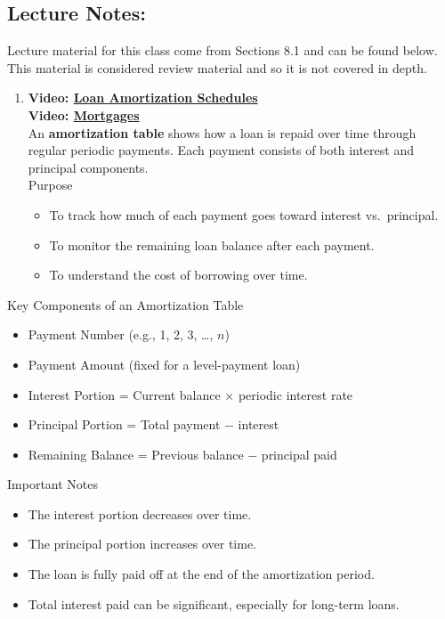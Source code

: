 \documentclass[
]{book}
\providecommand{\tightlist}{%
  \setlength{\itemsep}{0pt}\setlength{\parskip}{0pt}}
\begin{document}
\subsection*{Lecture Notes:}\label{lecture-notes-17}

Lecture material for this class come from Sections 8.1 and can be found below. This material is considered review material and so it is not covered in depth.

\begin{enumerate}
\def\labelenumi{\arabic{enumi}.}
\setcounter{enumi}{4}
\tightlist
\item
  \textbf{Video: \href{https://youtu.be/vdxdyhyXa8Q}{Loan Amortization Schedules}}\\
  \textbf{Video: \href{https://youtu.be/tZpRI_6_Og0}{Mortgages}}\\
  An \textbf{amortization table} shows how a loan is repaid over time through regular periodic payments. Each payment consists of both interest and principal components.\\
  Purpose

  \begin{itemize}
  \tightlist
  \item
    To track how much of each payment goes toward interest vs.~principal.
  \item
    To monitor the remaining loan balance after each payment.
  \item
    To understand the cost of borrowing over time.
  \end{itemize}
\end{enumerate}

Key Components of an Amortization Table

\begin{itemize}
\tightlist
\item
  Payment Number (e.g., 1, 2, 3, \ldots, \(n\))
\item
  Payment Amount (fixed for a level-payment loan)
\item
  Interest Portion = Current balance \(\times\) periodic interest rate
\item
  Principal Portion = Total payment \(-\) interest
\item
  Remaining Balance = Previous balance \(-\) principal paid
\end{itemize}

Important Notes

\begin{itemize}
\tightlist
\item
  The interest portion decreases over time.
\item
  The principal portion increases over time.
\item
  The loan is fully paid off at the end of the amortization period.
\item
  Total interest paid can be significant, especially for long-term loans.
\end{itemize}
\end{document}
